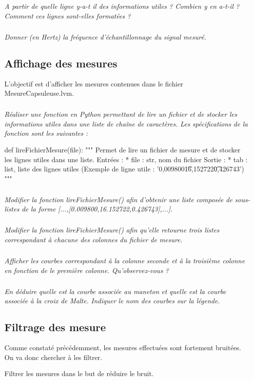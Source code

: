 \documentclass[10pt]{article}
\begin{document}
\subparagraph{}
\textit{A partir de quelle ligne y-a-t il des informations utiles ? Combien y en a-t-il ? Comment ces lignes sont-elles formatées ?}

\subparagraph{}
\textit{Donner (en Hertz) la fréquence d'échantillonnage du signal mesuré.}


\subsection*{Affichage des mesures}

\begin{obj}
L'objectif est d'afficher les mesures contenues dans le fichier \textsf{MesureCapsuleuse.lvm}.
\end{obj}




\subparagraph{}
\textit{Réaliser une fonction en Python permettant de lire un fichier et de stocker les informations utiles dans une liste de chaîne de caractères. Les spécifications de la fonction sont les suivantes :}

\begin{py}
\begin{python}
def lireFichierMesure(file):
    """
    Permet de lire un fichier de mesure et de stocker les lignes utiles dans une liste.
    Entrées : 
      * file : str, nom du fichier
    Sortie :
      * tab : list, liste des lignes utiles
          (Exemple de ligne utile : '0,009800\t16,152722\t0,426743\n')
    """
\end{python}
\end{py}

\subparagraph{}
\textit{Modifier la fonction \textsf{lireFichierMesure()} afin d'obtenir une liste composée de sous-listes de la forme \textsf{[...,[0.009800,16.152722,0.426743],...]}.}

\subparagraph{}
\textit{Modifier la fonction \textsf{lireFichierMesure()} afin qu'elle retourne trois listes correspondant à chacune des colonnes du fichier de mesure.}


\subparagraph{}
\textit{Afficher les courbes correspondant à la colonne seconde et à la troisième colonne en fonction de le première colonne. Qu'observez-vous ?}

\subparagraph{}
\textit{En déduire quelle est la courbe associée au maneton et quelle est la courbe associée à la croix de Malte. Indiquer le nom des courbes sur la légende.}

\subsection*{Filtrage des mesure}
Comme constaté précédemment, les mesures effectuées sont fortement bruitées. On va donc chercher à les filtrer. 
\begin{obj}
Filtrer les mesures dans le but de réduire le bruit.
\end{obj}
\end{document}
